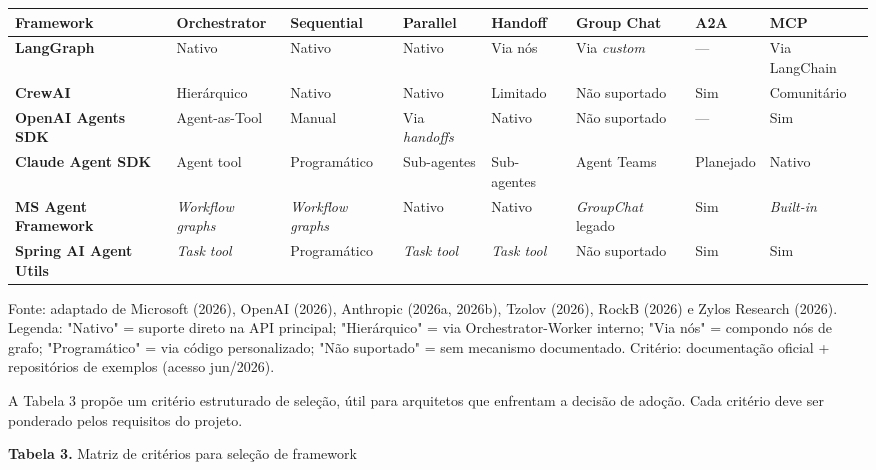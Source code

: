 \documentclass[12pt,a4paper]{article}
\begin{document}
\begin{center}
{\footnotesize
\setlength{\tabcolsep}{4pt}
\begin{tabularx}{\linewidth}{>{\raggedright\arraybackslash}X>{\centering\arraybackslash}X>{\centering\arraybackslash}X>{\centering\arraybackslash}X>{\centering\arraybackslash}X>{\centering\arraybackslash}X>{\centering\arraybackslash}X>{\centering\arraybackslash}X}
\toprule
\textbf{Framework} & \textbf{Orchestrator} & \textbf{Sequential} & \textbf{Parallel} & \textbf{Handoff} & \textbf{Group Chat} & \textbf{A2A} & \textbf{MCP} \\
\midrule
\textbf{LangGraph} & Nativo & Nativo & Nativo & Via nós & Via \textit{custom} & — & Via LangChain \\
\textbf{CrewAI} & Hierárquico & Nativo & Nativo & Limitado & Não suportado & Sim & Comunitário \\
\textbf{OpenAI Agents SDK} & Agent-as-Tool & Manual & Via \textit{handoffs} & Nativo & Não suportado & — & Sim \\
\textbf{Claude Agent SDK} & Agent tool & Programático & Sub-agentes & Sub-agentes & Agent Teams & Planejado & Nativo \\
\textbf{MS Agent Framework} & \textit{Workflow graphs} & \textit{Workflow graphs} & Nativo & Nativo & \textit{GroupChat} legado & Sim & \textit{Built-in} \\
\textbf{Spring AI Agent Utils} & \textit{Task tool} & Programático & \textit{Task tool} & \textit{Task tool} & Não suportado & Sim & Sim \\
\bottomrule
\end{tabularx}
}
\end{center}

Fonte: adaptado de Microsoft (2026), OpenAI (2026), Anthropic (2026a, 2026b), Tzolov (2026), RockB (2026) e Zylos Research (2026). Legenda: "Nativo" = suporte direto na API principal; "Hierárquico" = via Orchestrator-Worker interno; "Via nós" = compondo nós de grafo; "Programático" = via código personalizado; "Não suportado" = sem mecanismo documentado. Critério: documentação oficial + repositórios de exemplos (acesso jun/2026).

A Tabela 3 propõe um critério estruturado de seleção, útil para arquitetos que enfrentam a decisão de adoção. Cada critério deve ser ponderado pelos requisitos do projeto.

\textbf{Tabela 3.} Matriz de critérios para seleção de framework
\end{document}
